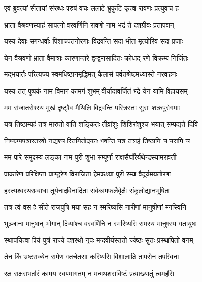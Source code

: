 
\twolineshloka
{एवं ब्रुवत्यां सीतायां संरब्धः परुषं वचः}
{ललाटे भ्रुकुटिं कृत्वा रावणः प्रत्युवाच ह} %

\twolineshloka
{भ्राता वैश्रवणस्याहं सापत्नो वरवर्णिनि}
{रावणो नाम भद्रं ते दशग्रीवः प्रतापवान्} %

\twolineshloka
{यस्य देवाः सगन्धर्वाः पिशाचपतगोरगाः}
{विद्रवन्ति सदा भीता मृत्योरिव सदा प्रजाः} %

\twolineshloka
{येन वैश्रवणो भ्राता वैमात्राः कारणान्तरे}
{द्वन्द्वमासादितः क्रोधाद् रणे विक्रम्य निर्जितः} %

\twolineshloka
{मद्भयार्तः परित्यज्य स्वमधिष्ठानमृद्धिमत्}
{कैलासं पर्वतश्रेष्ठमध्यास्ते नरवाहनः} %

\twolineshloka
{यस्य तत् पुष्पकं नाम विमानं कामगं शुभम्}
{वीर्यादावर्जितं भद्रे येन यामि विहायसम्} %

\twolineshloka
{मम संजातरोषस्य मुखं दृष्ट्वैव मैथिलि}
{विद्रवन्ति परित्रस्ताः सुराः शक्रपुरोगमाः} %

\twolineshloka
{यत्र तिष्ठाम्यहं तत्र मारुतो वाति शङ्कितः}
{तीव्रांशुः शिशिरांशुश्च भयात् सम्पद्यते दिवि} %

\twolineshloka
{निष्कम्पपत्रास्तरवो नद्यश्च स्तिमितोदकाः}
{भवन्ति यत्र तत्राहं तिष्ठामि च चरामि च} %

\twolineshloka
{मम पारे समुद्रस्य लङ्का नाम पुरी शुभा}
{सम्पूर्णा राक्षसैर्घोरैर्यथेन्द्रस्यामरावती} %

\twolineshloka
{प्राकारेण परिक्षिप्ता पाण्डुरेण विराजिता}
{हेमकक्ष्या पुरी रम्या वैदूर्यमयतोरणा} %

\twolineshloka
{हस्त्यश्वरथसम्बाधा तूर्यनादविनादिता}
{सर्वकामफलैर्वृक्षैः संकुलोद्यानभूषिता} %

\twolineshloka
{तत्र त्वं वस हे सीते राजपुत्रि मया सह}
{न स्मरिष्यसि नारीणां मानुषीणां मनस्विनि} %

\twolineshloka
{भुञ्जाना मानुषान् भोगान् दिव्यांश्च वरवर्णिनि}
{न स्मरिष्यसि रामस्य मानुषस्य गतायुषः} %

\twolineshloka
{स्थापयित्वा प्रियं पुत्रं राज्ये दशरथो नृपः}
{मन्दवीर्यस्ततो ज्येष्ठः सुतः प्रस्थापितो वनम्} %

\twolineshloka
{तेन किं भ्रष्टराज्येन रामेण गतचेतसा}
{करिष्यसि विशालाक्षि तापसेन तपस्विना} %

\twolineshloka
{रक्ष राक्षसभर्तारं कामय स्वयमागतम्}
{न मन्मथशराविष्टं प्रत्याख्यातुं त्वमर्हसि} %


